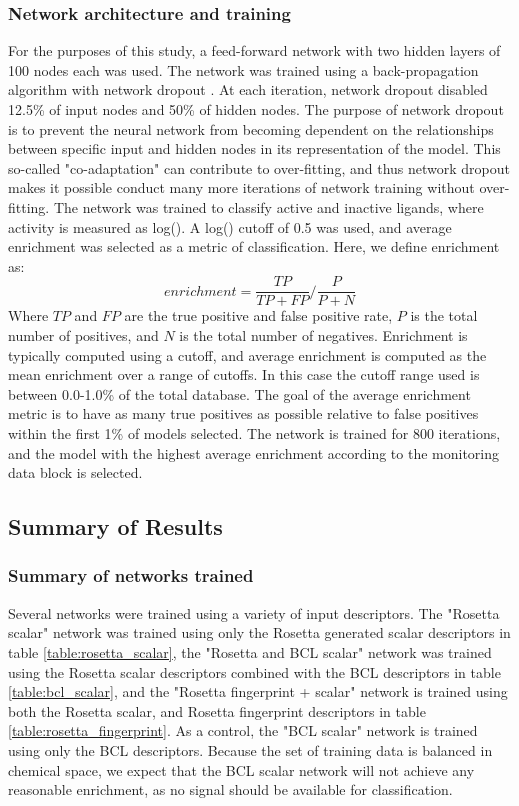 \subsubsection{Network architecture and training}

For the purposes of this study, a feed-forward network with two hidden layers of 100 nodes each was used.
The network was trained using a back-propagation algorithm with network dropout \citep{Hinton:2012tv}.
At each iteration, network dropout disabled 12.5\% of input nodes and 50\% of hidden nodes.
The purpose of network dropout is to prevent the neural network from becoming dependent on the relationships between specific input and hidden nodes in its representation of the model.
This so-called "co-adaptation" can contribute to over-fitting, and thus network dropout makes it possible conduct many more iterations of network training without over-fitting.
The network was trained to classify active and inactive ligands, where activity is measured as log(\ki).
A log(\ki) cutoff of 0.5 was used, and average enrichment was selected as a metric of classification.
Here, we define enrichment as:
\begin{equation}
\label{eq:enrichment}
enrichment = \frac{TP}{TP+FP}/\frac{P}{P+N}
\end{equation}
Where $TP$ and $FP$ are the true positive and false positive rate, $P$ is the total number of positives, and $N$ is the total number of negatives.
Enrichment is typically computed using a cutoff, and average enrichment is computed as the mean enrichment over a range of cutoffs.  In this case the cutoff range used is between 0.0-1.0\% of the total database.
The goal of the average enrichment metric is to have as many true positives as possible relative to false positives within the first 1\% of models selected.
The network is trained for 800 iterations, and the model with the highest average enrichment according to the monitoring data block is selected.

\subsection{Summary of Results}

\subsubsection{Summary of networks trained}
\label{subsubsec:network_training}
Several networks were trained using a variety of input descriptors.
The "Rosetta scalar" network was trained using only the Rosetta generated scalar descriptors in table \ref{table:rosetta_scalar}, the "Rosetta and BCL scalar" network was trained using the Rosetta scalar descriptors combined with the \ac{BCL} descriptors in table \ref{table:bcl_scalar}, and the "Rosetta fingerprint + scalar" network is trained using both the Rosetta scalar, and Rosetta fingerprint descriptors in table \ref{table:rosetta_fingerprint}.
As a control, the "\ac{BCL} scalar" network is trained using only the \ac{BCL} descriptors.
Because the set of training data is balanced in chemical space, we expect that the \ac{BCL} scalar network will not achieve any reasonable enrichment, as no signal should be available for classification.

